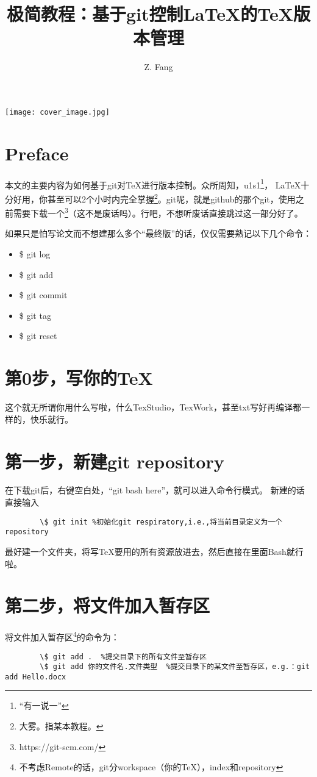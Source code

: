 \documentclass[cn,hazy,sakura,screen,14pt]{elegantnote}
\title{极简教程：基于git控制\LaTeX{}的\TeX{}版本管理}
\author{Z. Fang}
\institute{Chem. FDU}
\date{\zhtoday}
\begin{document}
	
	\maketitle
	
	\centerline{
		\texttt{[image: cover\_image.jpg]}
	}
	
	
	\section{Preface}
	
	本文的主要内容为如何基于git对\TeX{}进行版本控制。众所周知，u1s1\footnote{“有一说一”}， \LaTeX{}十分好用，你甚至可以2个小时内完全掌握\footnote{大雾。指某本教程。}。git呢，就是github的那个git，使用之前需要下载一个\footnote{https://git-scm.com/}（这不是废话吗）。行吧，不想听废话直接跳过这一部分好了。
	
	如果只是怕写论文而不想建那么多个“最终版”的话，仅仅需要熟记以下几个命令：
	\begin{itemize}
		\item \$ git log
		\item \$ git add
		\item \$ git commit
		\item \$ git tag
		\item \$ git reset
	\end{itemize}
	
	
	\section{第0步，写你的\TeX{}}
	这个就无所谓你用什么写啦，什么TexStudio，TexWork，甚至txt写好再编译都一样的，快乐就行。

	\section{第一步，新建git repository}
	在下载git后，右键空白处，“git bash here”，就可以进入命令行模式。
	新建的话直接输入
	\begin{lstlisting}
		\$ git init %初始化git respiratory,i.e.,将当前目录定义为一个repository
	\end{lstlisting}	
	
	\begin{remark}
	最好建一个文件夹，将写\TeX{}要用的所有资源放进去，然后直接在里面Bash就行啦。
	\end{remark}
	
	
	\section{第二步，将文件加入暂存区}
	将文件加入暂存区\footnote{不考虑Remote的话，git分workspace（你的\TeX{}），index和repository}的命令为：
	\begin{lstlisting}
		\$ git add .  %提交目录下的所有文件至暂存区
		\$ git add 你的文件名.文件类型  %提交目录下的某文件至暂存区，e.g.：git add Hello.docx	
	\end{lstlisting}
\end{document}
